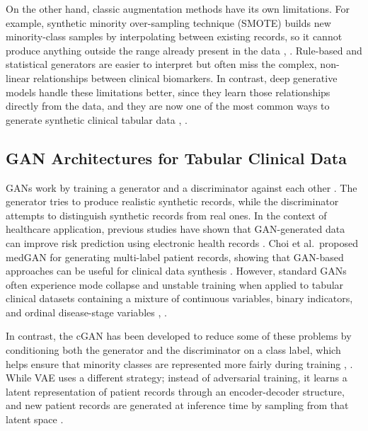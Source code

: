 \documentclass[journal]{IEEEtran}
\begin{document}
On the other hand, classic augmentation methods have its own limitations. For example, synthetic minority over-sampling technique (SMOTE) builds new minority-class samples by interpolating between existing records, so it cannot produce anything outside the range already present in the data \cite{kumari2024}, \cite{figueira2022}. Rule-based and statistical generators are easier to interpret but often miss the complex, non-linear relationships between clinical biomarkers. In contrast, deep generative models handle these limitations better, since they learn those relationships directly from the data, and they are now one of the most common ways to generate synthetic clinical tabular data \cite{yan2022}, \cite{nikolentzos2023}.

\subsection{GAN Architectures for Tabular Clinical Data}

GANs work by training a generator and a discriminator against each other \cite{vega2020}. The generator tries to produce realistic synthetic records, while the discriminator attempts to distinguish synthetic records from real ones. In the context of healthcare application, previous studies have shown that GAN-generated data can improve risk prediction using electronic health records \cite{che2017}. Choi et al.\ proposed medGAN for generating multi-label patient records, showing that GAN-based approaches can be useful for clinical data synthesis \cite{choi2017}. However, standard GANs often experience mode collapse and unstable training when applied to tabular clinical datasets containing a mixture of continuous variables, binary indicators, and ordinal disease-stage variables \cite{lenz2021}, \cite{espinosa2023}.

In contrast, the cGAN has been developed to reduce some of these problems by conditioning both the generator and the discriminator on a class label, which helps ensure that minority classes are represented more fairly during training \cite{vega2020}, \cite{sharma2024}. While VAE uses a different strategy; instead of adversarial training, it learns a latent representation of patient records through an encoder-decoder structure, and new patient records are generated at inference time by sampling from that latent space \cite{nikolentzos2023}.
\end{document}
